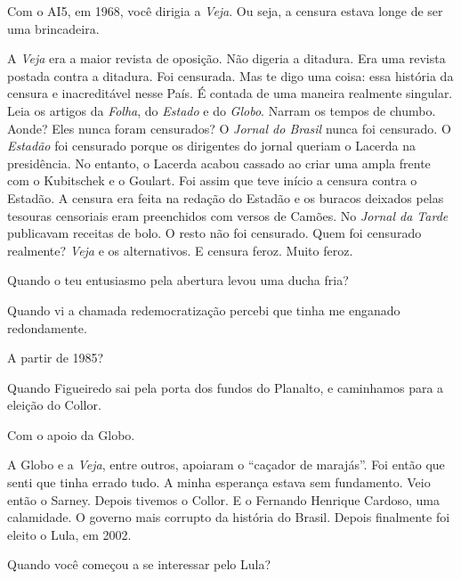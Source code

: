 \falaG Com o AI5, em 1968, você dirigia a \emph{Veja}. Ou seja, a censura
estava longe de ser uma brincadeira.

\falaM A \emph{Veja} era a maior revista de oposição. Não digeria a
ditadura. Era uma revista postada contra a ditadura. Foi censurada. Mas
te digo uma coisa: essa história da censura e inacreditável nesse País.
É contada de uma maneira realmente singular. Leia os artigos da
\emph{Folha}, do \emph{Estado} e do \emph{Globo}. Narram os tempos de
chumbo. Aonde? Eles nunca foram censurados? O \emph{Jornal do Brasil}
nunca foi censurado. O \emph{Estadão} foi censurado porque os dirigentes
do jornal queriam o Lacerda na presidência. No entanto, o Lacerda acabou
cassado ao criar uma ampla frente com o Kubitschek e o Goulart. Foi
assim que teve início a censura contra o Estadão. A censura era feita na
redação do Estadão e os buracos deixados pelas tesouras censoriais eram
preenchidos com versos de Camões. No \emph{Jornal da Tarde} publicavam
receitas de bolo. O resto não foi censurado. Quem foi censurado
realmente? \emph{Veja} e os alternativos. E censura feroz. Muito feroz.

\falaG Quando o teu entusiasmo pela abertura levou uma ducha fria?

\falaM Quando vi a chamada redemocratização percebi que tinha me enganado
redondamente.

\falaG A partir de 1985?

\falaM Quando Figueiredo sai pela porta dos fundos do Planalto, e caminhamos
para a eleição do Collor.

\falaG Com o apoio da Globo.

\falaM A Globo e a \emph{Veja}, entre outros, apoiaram o ``caçador de
marajás''. Foi então que senti que tinha errado tudo. A minha esperança
estava sem fundamento. Veio então o Sarney. Depois tivemos o Collor. E o
Fernando Henrique Cardoso, uma calamidade. O governo mais corrupto da
história do Brasil. Depois finalmente foi eleito o Lula, em 2002.

\falaG Quando você começou a se interessar pelo Lula?

